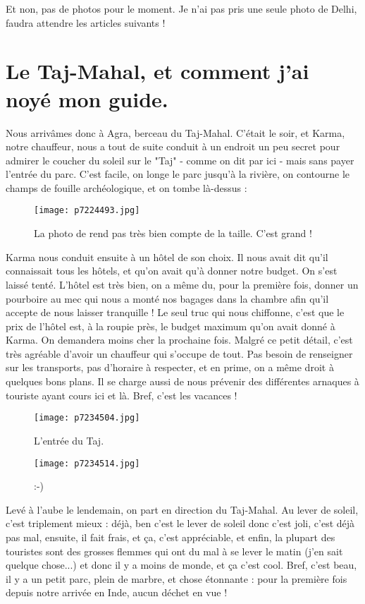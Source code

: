 \documentclass{book}
\begin{document}
Et non, pas de photos pour le moment. Je n'ai pas pris une seule photo de Delhi, faudra attendre les articles suivants !

\chapter{Le Taj-Mahal, et comment j'ai noyé mon guide.}
Nous arrivâmes donc à Agra, berceau du Taj-Mahal. C'était le soir, et Karma, notre chauffeur, nous a tout de suite conduit à un endroit un peu secret pour admirer le coucher du soleil sur le "Taj" - comme on dit par ici - mais sans payer l'entrée du parc. C'est facile, on longe le parc jusqu'à la rivière, on contourne le champs de fouille archéologique, et on tombe là-dessus :


\begin{figure}[h]
\centering
\texttt{[image: p7224493.jpg]}
\caption*{La photo de rend pas très bien compte de la taille. C'est grand !}
\end{figure}

Karma nous conduit ensuite à un hôtel de son choix. Il nous avait dit qu'il connaissait tous les hôtels, et qu'on avait qu'à donner notre budget. On s'est laissé tenté. L'hôtel est très bien, on a même du, pour la première fois, donner un pourboire au mec qui nous a monté nos bagages dans la chambre afin qu'il accepte de nous laisser tranquille ! Le seul truc qui nous chiffonne, c'est que le prix de l'hôtel est, à la roupie près, le budget maximum qu'on avait donné à Karma. On demandera moins cher la prochaine fois. Malgré ce petit détail, c'est très agréable d'avoir un chauffeur qui s'occupe de tout. Pas besoin de renseigner sur les transports, pas d'horaire à respecter, et en prime, on a même droit à quelques bons plans. Il se charge aussi de nous prévenir des différentes arnaques à touriste ayant cours ici et là. Bref, c'est les vacances !


\begin{figure}[h]
\centering
\texttt{[image: p7234504.jpg]}
\caption*{L'entrée du Taj.}
\end{figure}


\begin{figure}[h]
\centering
\texttt{[image: p7234514.jpg]}
\caption*{:-)}
\end{figure}

Levé à l'aube le lendemain, on part en direction du Taj-Mahal. Au lever de soleil, c'est triplement mieux : déjà, ben c'est le lever de soleil donc c'est joli, c'est déjà pas mal, ensuite, il fait frais, et ça, c'est appréciable, et enfin, la plupart des touristes sont des grosses flemmes qui ont du mal à se lever le matin (j'en sait quelque chose...) et donc il y a moins de monde, et ça c'est cool. Bref, c'est beau, il y a un petit parc, plein de marbre, et chose étonnante : pour la première fois depuis notre arrivée en Inde, aucun déchet en vue !
\end{document}
